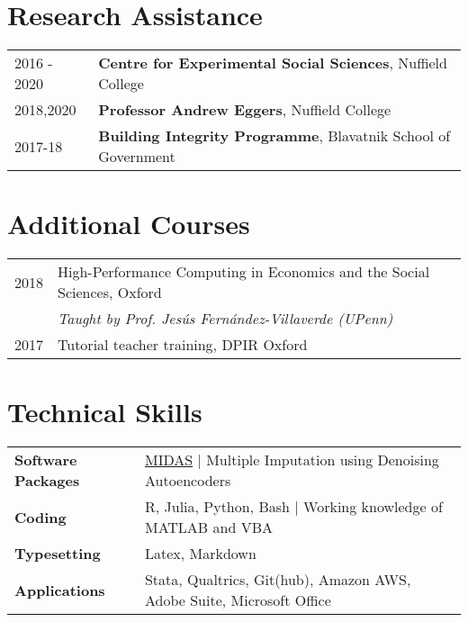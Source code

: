 \documentclass[11pt, a4paper]{article}
\begin{document}
  \section*{Research Assistance}
  \begin{tabular}{ll}
    2016 - 2020 & \textbf{Centre for Experimental Social Sciences}, Nuffield College \\
    2018,2020 & \textbf{Professor Andrew Eggers}, Nuffield College \\
    2017-18 & \textbf{Building Integrity Programme}, Blavatnik School of Government \\
 \end{tabular}

 \section*{Additional Courses}
 \begin{tabular}{ll}
     2018 & High-Performance Computing in Economics and the Social Sciences, Oxford\\
          & \textit{Taught by Prof. Jesús Fernández-Villaverde (UPenn)} \\
     2017 & Tutorial teacher training, DPIR Oxford\\
\end{tabular}

 \section*{Technical Skills}
 \begin{tabular}{ll}
 	 \textbf{Software Packages} & \href{https://github.com/ranjitlall/MIDAS}{MIDAS} $|$ Multiple Imputation using Denoising Autoencoders \\
     \textbf{Coding} & R, Julia, Python, Bash $|$ Working knowledge of MATLAB and VBA \\
     \textbf{Typesetting} & Latex, Markdown \\
     \textbf{Applications} & Stata, Qualtrics, Git(hub), Amazon AWS, Adobe Suite, Microsoft Office
 \end{tabular}
\end{document}

